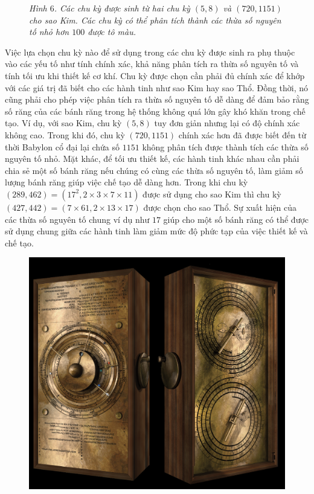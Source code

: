 \begin{multicols}{2}
\begin{figure}[H]
		\caption{\small\textit{\color{lichsutoanhoc}Hình $6$. Các chu kỳ được sinh từ hai chu kỳ $(5,8)$ và $(720,1151)$ cho sao Kim. Các chu kỳ có thể phân tích thành các thừa số nguyên tố nhỏ hơn $100$ được tô màu.}}
		\vspace*{-10pt}
	\end{figure}
	Việc lựa chọn chu kỳ nào để sử dụng trong các chu kỳ được sinh ra phụ thuộc vào các yếu tố như tính chính xác, khả năng phân tích ra thừa số nguyên tố và tính tối ưu khi thiết kế cơ khí. Chu kỳ được chọn cần phải đủ chính xác để khớp với các giá trị đã biết cho các hành tinh như sao Kim hay sao Thổ. Đồng thời, nó cũng phải cho phép việc phân tích ra thừa số nguyên tố dễ dàng để đảm bảo rằng số răng của các bánh răng trong hệ thống không quá lớn gây khó khăn trong chế tạo. Ví dụ, với sao Kim, chu kỳ $(5,8)$ tuy đơn giản nhưng lại có độ chính xác không cao. Trong khi đó, chu kỳ $(720,1151)$ chính xác hơn đã được biết đến từ thời Babylon cổ đại lại chứa số $1151$ không phân tích được thành tích các thừa số nguyên tố nhỏ. Mặt khác, để tối ưu thiết kế, các hành tinh khác nhau cần phải chia sẻ một số bánh răng nếu chúng có cùng các thừa số nguyên tố, làm giảm số lượng bánh răng giúp việc chế tạo dễ dàng hơn. Trong khi chu kỳ $(289,462)=(17^2,2\times3\times7\times11)$ được sử dụng cho sao Kim thì chu kỳ $(427,442)=(7\times61,2\times13\times17)$ được chọn cho sao Thổ. Sự xuất hiện của các thừa số nguyên tố chung ví dụ như $17$ giúp cho một số bánh răng có thể được sử dụng chung giữa các hành tinh làm giảm mức độ phức tạp của việc thiết kế và chế tạo.
	\begin{figure}[H]
		\vspace*{-5pt}
		\centering
		\captionsetup{labelformat= empty, justification=centering}
		\includegraphics[width= 1\linewidth]{8}

\end{figure}
\end{multicols}
